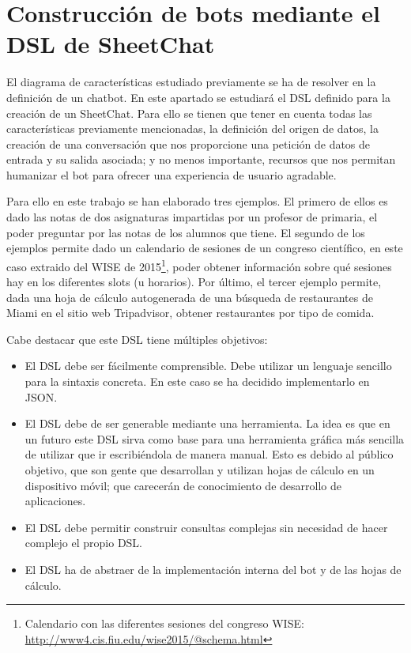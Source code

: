 \chapter{Construcción de bots mediante el DSL de SheetChat}

El diagrama de características estudiado previamente se ha de resolver en la definición de un chatbot. En este apartado se estudiará el DSL definido para la creación de un SheetChat. Para ello se tienen que tener en cuenta todas las características previamente mencionadas, la definición del origen de datos, la creación de una conversación que nos proporcione una petición de datos de entrada y su salida asociada; y no menos importante, recursos que nos permitan humanizar el bot para ofrecer una experiencia de usuario agradable.

Para ello en este trabajo se han elaborado tres ejemplos. El primero de ellos es dado las notas de dos asignaturas impartidas por un profesor de primaria, el poder preguntar por las notas de los alumnos que tiene. El segundo de los ejemplos permite dado un calendario de sesiones de un congreso científico, en este caso extraido del WISE de 2015\footnote{Calendario con las diferentes sesiones del congreso WISE: \url{http://www4.cis.fiu.edu/wise2015/@schema.html}}, poder obtener información sobre qué sesiones hay en los diferentes slots (u horarios). Por último, el tercer ejemplo permite, dada una hoja de cálculo autogenerada de una búsqueda de restaurantes de Miami en el sitio web Tripadvisor, obtener restaurantes por tipo de comida.

Cabe destacar que este DSL tiene múltiples objetivos:
\begin{itemize}
	\item El DSL debe ser fácilmente comprensible. Debe utilizar un lenguaje sencillo para la sintaxis concreta. En este caso se ha decidido implementarlo en JSON.
	\item El DSL debe de ser generable mediante una herramienta. La idea es que en un futuro este DSL sirva como base para una herramienta gráfica más sencilla de utilizar que ir escribiéndola de manera manual. Esto es debido al público objetivo, que son gente que desarrollan y utilizan hojas de cálculo en un dispositivo móvil; que carecerán de conocimiento de desarrollo de aplicaciones.
	\item El DSL debe permitir construir consultas complejas sin necesidad de hacer complejo el propio DSL.
	\item El DSL ha de abstraer de la implementación interna del bot y de las hojas de cálculo.
\end{itemize}

